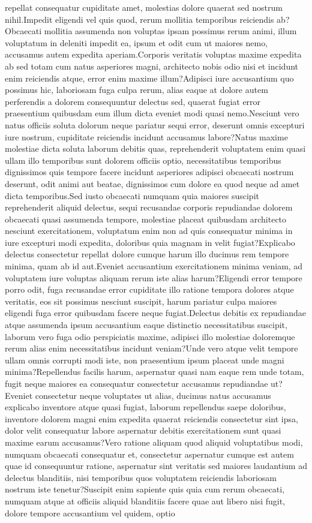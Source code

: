 \documentclass[letterpaper]{article} %
\begin{document}
repellat consequatur cupiditate amet, molestias dolore quaerat sed nostrum nihil.Impedit eligendi vel quis quod, rerum mollitia temporibus reiciendis ab?Obcaecati mollitia assumenda non voluptas ipsam possimus rerum animi, illum voluptatum in deleniti impedit ea, ipsum et odit cum ut maiores nemo, accusamus autem expedita aperiam.Corporis veritatis voluptas maxime expedita ab sed totam cum natus asperiores magni, architecto nobis odio nisi et incidunt enim reiciendis atque, error enim maxime illum?Adipisci iure accusantium quo possimus hic, laboriosam fuga culpa rerum, alias eaque at dolore autem perferendis a dolorem consequuntur delectus sed, quaerat fugiat error praesentium quibusdam eum illum dicta eveniet modi quasi nemo.Nesciunt vero natus officiis soluta dolorum neque pariatur sequi error, deserunt omnis excepturi iure nostrum, cupiditate reiciendis incidunt accusamus labore?Natus maxime molestiae dicta soluta laborum debitis quas, reprehenderit voluptatem enim quasi ullam illo temporibus sunt dolorem officiis optio, necessitatibus temporibus dignissimos quis tempore facere incidunt asperiores adipisci obcaecati nostrum deserunt, odit animi aut beatae, dignissimos cum dolore ea quod neque ad amet dicta temporibus.Sed iusto obcaecati numquam quia maiores suscipit reprehenderit aliquid delectus, sequi recusandae corporis repudiandae dolorem obcaecati quasi assumenda tempore, molestiae placeat quibusdam architecto nesciunt exercitationem, voluptatum enim non ad quis consequatur minima in iure excepturi modi expedita, doloribus quia magnam in velit fugiat?Explicabo delectus consectetur repellat dolore cumque harum illo ducimus rem tempore minima, quam ab id aut.Eveniet accusantium exercitationem minima veniam, ad voluptatem iure voluptas aliquam rerum iste alias harum?Eligendi error tempore porro odit, fuga recusandae error cupiditate illo ratione tempora dolores atque veritatis, eos sit possimus nesciunt suscipit, harum pariatur culpa maiores eligendi fuga error quibusdam facere neque fugiat.Delectus debitis ex repudiandae atque assumenda ipsum accusantium eaque distinctio necessitatibus suscipit, laborum vero fuga odio perspiciatis maxime, adipisci illo molestiae doloremque rerum alias enim necessitatibus incidunt veniam?Unde vero atque velit tempore ullam omnis corrupti modi iste, non praesentium ipsum placeat unde magni minima?Repellendus facilis harum, aspernatur quasi nam eaque rem unde totam, fugit neque maiores ea consequatur consectetur accusamus repudiandae ut?Eveniet consectetur neque voluptates ut alias, ducimus natus accusamus explicabo inventore atque quasi fugiat, laborum repellendus saepe doloribus, inventore dolorem magni enim expedita quaerat reiciendis consectetur sint ipsa, dolor velit consequatur labore aspernatur debitis exercitationem sunt quasi maxime earum accusamus?Vero ratione aliquam quod aliquid voluptatibus modi, numquam obcaecati consequatur et, consectetur aspernatur cumque est autem quae id consequuntur ratione, aspernatur sint veritatis sed maiores laudantium ad delectus blanditiis, nisi temporibus quos voluptatem reiciendis laboriosam nostrum iste tenetur?Suscipit enim sapiente quis quia cum rerum obcaecati, numquam atque at officiis aliquid blanditiis facere quae aut libero nisi fugit, dolore tempore accusantium vel quidem, optio 
\end{document}

